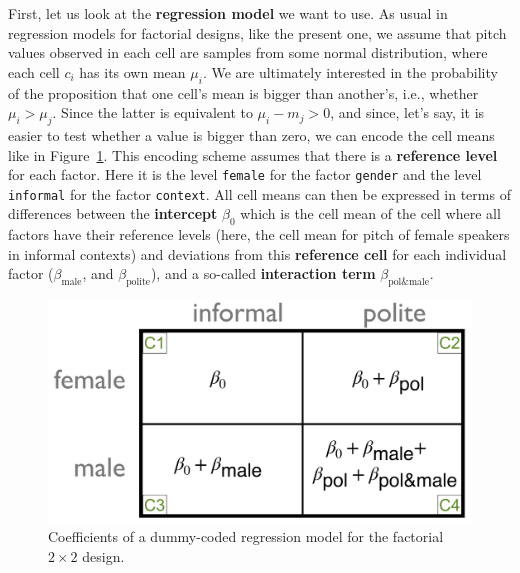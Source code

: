 \documentclass[nobib]{tufte-handout}
\begin{document}
First, let us look at the \textbf{regression model} we want to use. As usual in regression models for
factorial designs, like the present one, we assume that pitch values observed in each cell are
samples from some normal distribution, where each cell $c_i$ has its own mean $\mu_i$. We are
ultimately interested in the probability of the proposition that one cell's mean is bigger than
another's, i.e., whether $\mu_i > \mu_j$. Since the latter is equivalent to $\mu_i - m_j > 0$,
and since, let's say, it is easier to test whether a value is bigger than zero, we can encode
the cell means like in Figure~\ref{fig:coefficients_table}. This encoding scheme assumes that
there is a \textbf{reference level} for each factor. Here it is the level \texttt{female} for
the factor \texttt{gender} and the level \texttt{informal} for the factor
\texttt{context}. All cell means can then be expressed in terms of
differences between the \textbf{intercept} $\beta_0$ which is the cell mean of the cell where
all factors have their reference levels (here, the cell mean for pitch of female speakers in
informal contexts) and deviations from this \textbf{reference cell} for each individual factor
($\beta_{\text{male}}$, and $\beta_{\text{polite}}$), and a so-called \textbf{interaction term}
$\beta_{\text{pol\&male}}$.

\begin{figure}[h]
  \centering
    \includegraphics[width = \textwidth]{pics/table_coefficients.png}
    \caption{Coefficients of a dummy-coded regression model for the factorial $2 \times 2$ design.}
    \label{fig:coefficients_table}
\end{figure}
\end{document}
